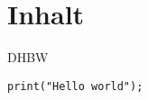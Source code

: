 
\section{Inhalt}

\ac{DHBW} \cite{BookKey} \cite{OnlineKey} 

\begin{lstlisting}
print("Hello world");
\end{lstlisting}
